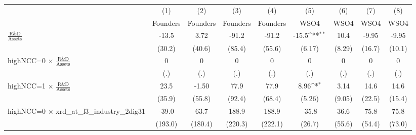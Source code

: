 {
\def\sym#1{\ifmmode^{#1}\else\(^{#1}\)\fi}
\begin{tabular}{l*{8}{c}}
\toprule
                    &\multicolumn{1}{c}{(1)}&\multicolumn{1}{c}{(2)}&\multicolumn{1}{c}{(3)}&\multicolumn{1}{c}{(4)}&\multicolumn{1}{c}{(5)}&\multicolumn{1}{c}{(6)}&\multicolumn{1}{c}{(7)}&\multicolumn{1}{c}{(8)}\\
                    &\multicolumn{1}{c}{Founders}&\multicolumn{1}{c}{Founders}&\multicolumn{1}{c}{Founders}&\multicolumn{1}{c}{Founders}&\multicolumn{1}{c}{WSO4}&\multicolumn{1}{c}{WSO4}&\multicolumn{1}{c}{WSO4}&\multicolumn{1}{c}{WSO4}\\
\midrule
$\frac{\textrm{R\&D}}{\textrm{Assets}}$&       -13.5         &        3.72         &       -91.2         &       -91.2         &       -15.5\sym{**} &        10.4         &       -9.95         &       -9.95         \\
                    &      (30.2)         &      (40.6)         &      (85.4)         &      (55.6)         &      (6.17)         &      (8.29)         &      (16.7)         &      (10.1)         \\
\addlinespace
highNCC=0 $\times$ $\frac{\textrm{R\&D}}{\textrm{Assets}}$&           0         &           0         &           0         &           0         &           0         &           0         &           0         &           0         \\
                    &         (.)         &         (.)         &         (.)         &         (.)         &         (.)         &         (.)         &         (.)         &         (.)         \\
\addlinespace
highNCC=1 $\times$ $\frac{\textrm{R\&D}}{\textrm{Assets}}$&        23.5         &       -1.50         &        77.9         &        77.9         &        8.96\sym{*}  &        3.14         &        14.6         &        14.6         \\
                    &      (35.9)         &      (55.8)         &      (92.4)         &      (68.4)         &      (5.26)         &      (9.05)         &      (22.5)         &      (15.4)         \\
\addlinespace
highNCC=0 $\times$ xrd\_at\_l3\_industry\_2dig31&       -39.0         &        63.7         &       188.9         &       188.9         &       -35.8         &        36.6         &        75.8         &        75.8         \\
                    &     (193.0)         &     (180.4)         &     (220.3)         &     (222.1)         &      (26.7)         &      (55.6)         &      (54.4)         &      (73.0)         \\

\end{tabular}}
